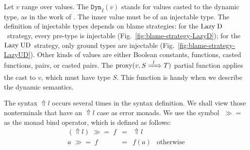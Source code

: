 \documentclass[runningheads]{llncs}
\newcommand{\LUD}{\ensuremath{\text{Lazy\;UD}}}
\newcommand{\LD}{\ensuremath{\text{Lazy\;D}}}
\newcommand{\error}[1]{\ensuremath{\Uparrow#1}}
\newcommand{\Pbool}[0]{\ensuremath{\mathtt{Bool}}}
\newcommand{\etrue}[0]{\mathtt{true}}
\newcommand{\ecast}[2]{\ensuremath{#1 : #2}}
\newcommand{\ccast}[3]{#1 \xRightarrow[]{\enskip #2 \enskip} #3}
\newcommand{\vdyn}[2]{\mathtt{Dyn}_{#1}(#2)}
\newcommand{\mbind}[0]{\ensuremath{\;\gg=\;}}
\newcommand{\proxy}[2]{\ensuremath{\mathrm{proxy}(#1,#2)}}
\begin{document}
Let $v$ range over values. The $\vdyn{I}{v}$ stands for values casted
to the dynamic type, as in the work of \citet{wadler2009well}. The
inner value must be of an injectable type. The definition of
injectable types depends on blame strategies:
%
for the \LD\ strategy, every pre-type is injectable 
(Fig.~\ref{fig:blame-strategy-LazyD});
%
for the \LUD\ strategy, only ground types are injectable 
(Fig.~\ref{fig:blame-strategy-LazyUD}).
%
Other kinds of values are either Boolean constants, functions, casted 
functions, pairs, or casted pairs.
%
The \proxy{v}{\ccast{S}{l}{T}} partial function applies the cast to $v$, which must
have type $S$. This function is handy when we describe the dynamic semantics.

The syntax \error{l} occurs several times in the syntax definition. We shall 
view those nonterminals that have an \error{l} case as error monads. We use 
the symbol \mbind{} as the monad bind operator, which is defined as follows:
\[
\begin{array}{rcll}
(\error{l}) \mbind f & = & \error{l} \\
          a \mbind f & = & f(a)      & \text{otherwise}
\end{array}
\]
\end{document}
